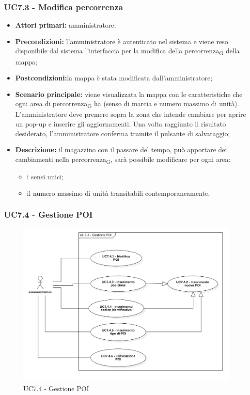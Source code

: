 \subsubsection{UC7.3 - Modifica percorrenza}
\begin{itemize}
	\item 	\textbf{Attori primari:} amministratore;
	\item 	\textbf{Precondizioni:}  l’amministratore è autenticato nel sistema e viene reso disponibile dal sistema l’interfaccia per la modifica della \gls{percorrenza}\textsubscript{G} della mappa;
	\item 	\textbf{Postcondizioni:}la mappa è stata modificata dall’amministratore;
	\item 	\textbf{Scenario principale:} viene visualizzata la mappa con le caratteristiche che ogni area di \gls{percorrenza}\textsubscript{G} ha (senso di marcia e numero massimo di unità). L’amministratore deve premere sopra la zona che intende cambiare per aprire un pop-up e inserire gli aggiornamenti. Una volta raggiunto il risultato desiderato, l’amministratore conferma tramite il pulsante di salvataggio;
	\item 	\textbf{Descrizione:} il magazzino con il passare del tempo, può apportare dei cambiamenti nella \gls{percorrenza}\textsubscript{G}, sarà possibile modificare per ogni area:
	\begin{itemize}
		\item i sensi unici;
		\item il numero massimo di unità transitabili contemporaneamente.
	\end{itemize}
\end{itemize}

\subsubsection{UC7.4 - Gestione POI}

\begin{figure}[H]
	\centering
	\includegraphics[scale=0.52]{res/images/uc7-4.png}
	\caption{UC7.4 - Gestione POI}
\end{figure}

